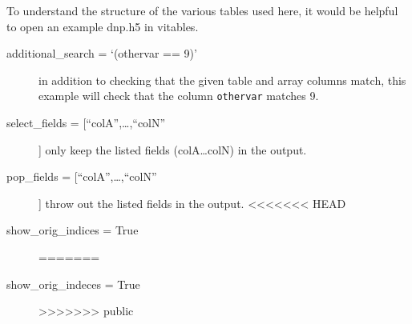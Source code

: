 To understand the structure of the various tables used here, it
    would be helpful to open an example dnp.h5 in vitables.

    \begin{mykwargs}
        \begin{description}
            \item[additional\_search = `(othervar == 9)']
                in addition to checking that the given table and
                array columns match, this example will check that the
                column \texttt{othervar} matches 9.
            \item[select\_fields = [``colA'',\ldots,``colN''] ] only
                keep the listed fields (colA\ldots colN) in the output.
            \item[pop\_fields = [``colA'',\ldots,``colN''] ] 
                throw out the listed fields in the output.
<<<<<<< HEAD
            \item[show\_orig\_indices = True]
=======
            \item[show\_orig\_indeces = True]
>>>>>>> public
        \end{description}
    \end{mykwargs}

